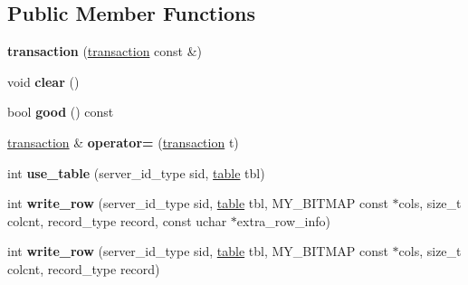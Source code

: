 \subsection*{Public Member Functions}
\begin{DoxyCompactItemize}
\item 
\mbox{\label{classinjector_1_1transaction_ab6024a52e12025f4b18b31f269fcb5a8}} 
{\bfseries transaction} (\mbox{\hyperlink{classinjector_1_1transaction}{transaction}} const \&)
\item 
\mbox{\label{classinjector_1_1transaction_a5dba8e0d51c5b2dab290a9ccdae07281}} 
void {\bfseries clear} ()
\item 
\mbox{\label{classinjector_1_1transaction_a508254b94efa2d27082e7ae67ca915f5}} 
bool {\bfseries good} () const
\item 
\mbox{\label{classinjector_1_1transaction_a70efe1a48a2b478a516a4076879fac1d}} 
\mbox{\hyperlink{classinjector_1_1transaction}{transaction}} \& {\bfseries operator=} (\mbox{\hyperlink{classinjector_1_1transaction}{transaction}} t)
\item 
\mbox{\label{classinjector_1_1transaction_a88488a9507748be1b908d89266a0dcb6}} 
int {\bfseries use\+\_\+table} (server\+\_\+id\+\_\+type sid, \mbox{\hyperlink{classinjector_1_1transaction_1_1table}{table}} tbl)
\item 
\mbox{\label{classinjector_1_1transaction_a73c73c461b71ac2d04bddb8361ad7e05}} 
int {\bfseries write\+\_\+row} (server\+\_\+id\+\_\+type sid, \mbox{\hyperlink{classinjector_1_1transaction_1_1table}{table}} tbl, M\+Y\+\_\+\+B\+I\+T\+M\+AP const $\ast$cols, size\+\_\+t colcnt, record\+\_\+type record, const uchar $\ast$extra\+\_\+row\+\_\+info)
\item 
\mbox{\label{classinjector_1_1transaction_a2fd5b63a7114d808173395722c3ca752}} 
int {\bfseries write\+\_\+row} (server\+\_\+id\+\_\+type sid, \mbox{\hyperlink{classinjector_1_1transaction_1_1table}{table}} tbl, M\+Y\+\_\+\+B\+I\+T\+M\+AP const $\ast$cols, size\+\_\+t colcnt, record\+\_\+type record)

\end{DoxyCompactItemize}
